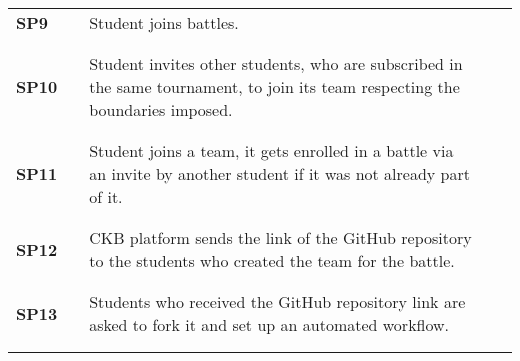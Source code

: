 \begin{longtable}[H]{l l p{8.5cm} l l}
    \textbf{SP9}   & \vline & Student joins battles.                                                                                                            & \vline &                        \\
                   &        &                                                                                                                                   &        &                        \\\hline & & \\
    \textbf{SP10}  & \vline & Student invites other students, who are subscribed in the same tournament, to join its team respecting the boundaries imposed.    & \vline &                        \\
                   &        &                                                                                                                                   &        &                        \\\hline & & \\
    \textbf{SP11}  & \vline & Student joins a team, it gets enrolled in a battle via an invite by another student if it was not already part of it.             & \vline &                        \\
                   &        &                                                                                                                                   &        &                        \\\hline & & \\
    \textbf{SP12}  & \vline & CKB platform sends the link of the GitHub repository to the students who created the team for the battle.                         & \vline &                        \\
                   &        &                                                                                                                                   &        &                        \\\hline & & \\
    \textbf{SP13}  & \vline & Students who received the GitHub repository link are asked to fork it and set up an automated workflow.                           & \vline &                        \\
                   &        &                                                                                                                                   &        &                        \\\hline & & \\

\end{longtable}
